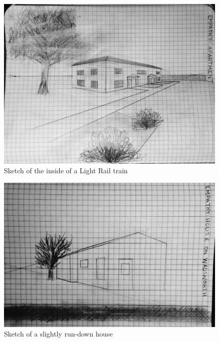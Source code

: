 \documentclass[11pt]{article}
\begin{document}
\begin{figure}[H]
    \centering
    \includegraphics[width=160mm]{resources/apartment.jpg}
    \caption{Sketch of the inside of a Light Rail train}
\end{figure}

\begin{figure}[H]
    \centering
    \includegraphics[width=160mm]{resources/house.jpg}
    \caption{Sketch of a slightly run-down house}
\end{figure}
\end{document}
